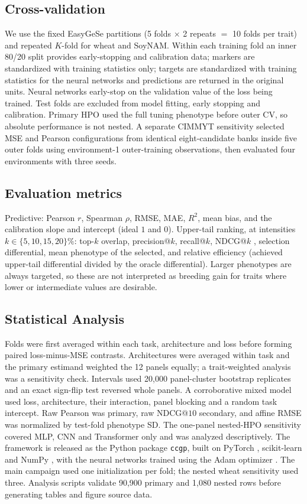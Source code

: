 \documentclass[9pt,twocolumn,twoside,lineno]{gsag3jnl}
\theoremstyle{plain}
\theoremstyle{remark}
\begin{document}
\subsection{Cross-validation}
We use the fixed EasyGeSe partitions (5 folds
$\times$ 2 repeats $=$ 10 folds per trait) and repeated $K$-fold for wheat and
SoyNAM. Within each training fold an inner 80/20 split provides early-stopping and
calibration data; markers are standardized with training statistics only;
targets are standardized with training statistics for the neural networks and
predictions are returned in the original units. Neural networks early-stop on the
validation value of the loss being trained. Test folds are excluded from model
fitting, early stopping and calibration. Primary HPO used the full tuning
phenotype before outer CV, so absolute performance is not nested. A separate CIMMYT
sensitivity selected MSE and Pearson configurations from identical
eight-candidate banks inside five outer folds using environment-1 outer-training
observations, then evaluated four environments with three seeds.

\subsection{Evaluation metrics}
Predictive: Pearson $r$, Spearman $\rho$, RMSE,
MAE, $R^2$, mean bias, and the calibration slope and intercept (ideal $1$ and
$0$). Upper-tail ranking, at intensities $k\in\{5,10,15,20\}\%$: top-$k$ overlap,
precision@$k$, recall@$k$, NDCG@$k$ \citep{jarvelin2002ndcg}, selection
differential, mean phenotype of the selected, and relative efficiency (achieved
upper-tail differential divided by the oracle differential). Larger phenotypes
are always targeted, so these are not interpreted as breeding gain for traits
where lower or intermediate values are desirable.

\subsection{Statistical Analysis}
Folds were first averaged within each task, architecture and loss before forming
paired loss-minus-MSE contrasts. Architectures were averaged within task and the
primary estimand weighted the 12 panels equally; a trait-weighted analysis was a
sensitivity check. Intervals used 20,000 panel-cluster bootstrap replicates and
an exact sign-flip test reversed whole panels. A corroborative mixed model used
loss, architecture, their interaction, panel blocking and a random task
intercept. Raw Pearson was primary, raw NDCG@$10$ secondary, and affine RMSE was
normalized by test-fold phenotype SD. The one-panel nested-HPO sensitivity
covered MLP, CNN and Transformer only and was analyzed descriptively.
The framework is released as the Python package
\texttt{ccgp}, built on PyTorch \citep{paszke2019pytorch}, scikit-learn
\citep{pedregosa2011sklearn} and NumPy
\citep{harris2020numpy}, with the neural networks trained using the Adam optimizer
\citep{kingma2015adam}. The main campaign used one initialization per fold; the
nested wheat sensitivity used three. Analysis scripts validate 90,900 primary
and 1,080 nested rows before generating tables and figure source data.
\end{document}
